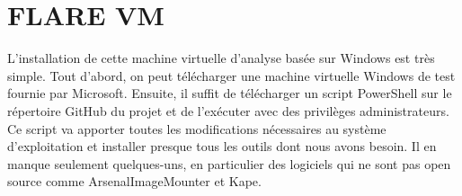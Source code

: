 \section{FLARE VM}

L'installation de cette machine virtuelle d'analyse basée sur Windows est très simple. Tout d'abord, on peut télécharger une machine virtuelle Windows de test fournie par Microsoft. Ensuite, il suffit de télécharger un script PowerShell sur le répertoire GitHub du projet et de l'exécuter avec des privilèges administrateurs. Ce script va apporter toutes les modifications nécessaires au système d'exploitation et installer presque tous les outils dont nous avons besoin. Il en manque seulement quelques-uns, en particulier des logiciels qui ne sont pas open source comme ArsenalImageMounter et Kape.

